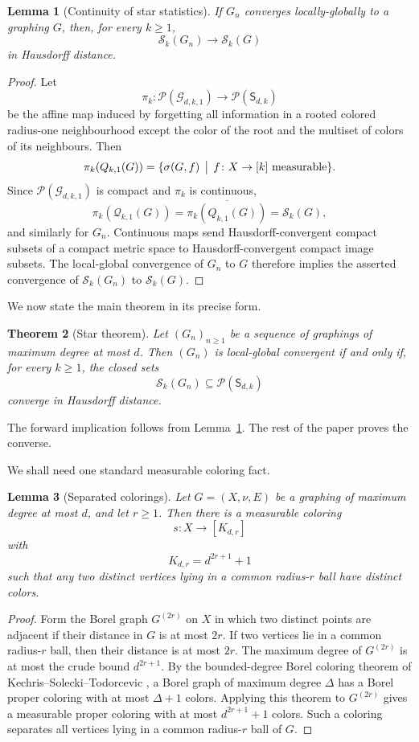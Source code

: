 \documentclass[11pt]{amsart}
\newcommand{\calG}{\mathcal G}
\newcommand{\calP}{\mathcal P}
\newcommand{\calQ}{\mathcal Q}
\newcommand{\calS}{\mathcal S}
\newtheorem{theorem}{Theorem}[section]
\newtheorem{lemma}[theorem]{Lemma}
\theoremstyle{remark}
\begin{document}
\begin{lemma}[Continuity of star statistics]\label{lem:star-continuity}
If $G_n$ converges locally-globally to a graphing $G$, then, for every $k\geq 1$,
\[
 \calS_k(G_n)\longrightarrow \calS_k(G)
\]
in Hausdorff distance.
\end{lemma}

\begin{proof}
Let
\[
 \pi_k\colon \calP(\calG_{d,k,1})\to \calP(\mathsf S_{d,k})
\]
be the affine map induced by forgetting all information in a rooted colored radius-one neighbourhood except the color of the root and the multiset of colors of its neighbours.  Then
\[
 \pi_k(Q_{k,1}(G))=\{\sigma(G,f)\,\bigm|\,f\colon X\to[k]\text{ measurable}\}.
\]
Since $\calP(\calG_{d,k,1})$ is compact and $\pi_k$ is continuous,
\[
 \pi_k(\calQ_{k,1}(G))=\overline{\pi_k(Q_{k,1}(G))}=\calS_k(G),
\]
and similarly for $G_n$.  Continuous maps send Hausdorff-convergent compact subsets of a compact metric space to Hausdorff-convergent compact image subsets.  The local-global convergence of $G_n$ to $G$ therefore implies the asserted convergence of $\calS_k(G_n)$ to $\calS_k(G)$.
\end{proof}

We now state the main theorem in its precise form.

\begin{theorem}[Star theorem]\label{thm:main}
Let $(G_n)_{n\geq 1}$ be a sequence of graphings of maximum degree at most $d$.  Then $(G_n)$ is local-global convergent if and only if, for every $k\geq 1$, the closed sets
\[
 \calS_k(G_n)\subseteq\calP(\mathsf S_{d,k})
\]
converge in Hausdorff distance.
\end{theorem}

The forward implication follows from Lemma~\ref{lem:star-continuity}.  The rest of the paper proves the converse.

We shall need one standard measurable coloring fact.

\begin{lemma}[Separated colorings]\label{lem:separated-coloring}
Let $G=(X,\nu,E)$ be a graphing of maximum degree at most $d$, and let $r\geq 1$.  Then there is a measurable coloring
\[
 s\colon X\to[K_{d,r}]
\]
with
\[
 K_{d,r}=d^{2r+1}+1
\]
such that any two distinct vertices lying in a common radius-$r$ ball have distinct colors.
\end{lemma}

\begin{proof}
Form the Borel graph $G^{(2r)}$ on $X$ in which two distinct points are adjacent if their distance in $G$ is at most $2r$.  If two vertices lie in a common radius-$r$ ball, then their distance is at most $2r$.  The maximum degree of $G^{(2r)}$ is at most the crude bound $d^{2r+1}$.  By the bounded-degree Borel coloring theorem of Kechris--Solecki--Todorcevic \cite{KST}, a Borel graph of maximum degree $\Delta$ has a Borel proper coloring with at most $\Delta+1$ colors.  Applying this theorem to $G^{(2r)}$ gives a measurable proper coloring with at most $d^{2r+1}+1$ colors.  Such a coloring separates all vertices lying in a common radius-$r$ ball of $G$.
\end{proof}
\end{document}
